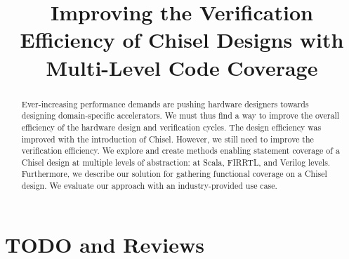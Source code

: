 \documentclass[runningheads]{llncs}
\begin{document}
%
\title{Improving the Verification Efficiency of Chisel Designs with Multi-Level Code Coverage}
%
%
%

%
%
\maketitle              %
%
\begin{abstract}
Ever-increasing performance demands are pushing hardware designers towards designing domain-specific accelerators. We must thus find a way to improve the overall efficiency of the hardware design and verification cycles. The design efficiency was improved with the introduction of Chisel. However, we still need to improve the verification efficiency.
We explore and create methods enabling statement coverage of a Chisel design at multiple levels of abstraction: at Scala, FIRRTL, and Verilog levels. Furthermore, we describe our solution for gathering functional coverage on a Chisel design.
We evaluate our approach with an industry-provided use case.



\end{abstract}
%
%
%
\section{TODO and Reviews}
\end{document}
